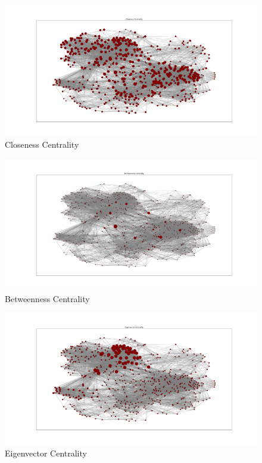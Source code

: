 \documentclass[conference]{IEEEtran}
\begin{document}
\begin{figure}[htb!]
    \centering
    \includegraphics[width=1\linewidth]{images/closeness_centrality.png}
    \caption{Closeness Centrality}
    \label{fig:enter-label}
\end{figure}

\begin{figure}
    \centering
    \includegraphics[width=1\linewidth]{images/betweenness_centrality.png}
    \caption{Betweenness Centrality}
    \label{fig:enter-label}
\end{figure}

\begin{figure}
    \centering
    \includegraphics[width=1\linewidth]{images/eigenvector_centrality.png}
    \caption{Eigenvector Centrality}
    \label{fig:enter-label}
\end{figure}
\end{document}
